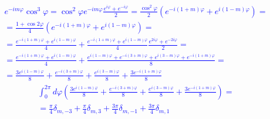 \textcolor{blue}{ \begin{equation*} \begin{aligned}
e^{-i m \varphi} \cos^3 \varphi = 
\cos^2 \varphi e^{-i m \varphi} \frac{e^{i \varphi} + e^{-i \varphi}}{2} =
\frac{\cos^2 \varphi}{2} 
\left( e^{-i (1+m) \varphi} + e^{i (1-m) \varphi} \right) = \\
= \frac{ 1 + \cos 2 \varphi } { 4 } 
\left( e^{-i (1+m) \varphi} + e^{i (1-m) \varphi} \right) = \\
= \frac{e^{-i(1+m) \varphi} + e^{i(1-m) \varphi}}{4} + 
\frac{e^{-i(1+m) \varphi} + e^{i(1-m) \varphi}}{4}
\frac{e^{2i\varphi} + e^{-2i\varphi}}{2} = \\
= \frac{e^{-i(1+m) \varphi} + e^{i(1-m) \varphi}}{4} +
\frac{ e^{i(1-m) \varphi} + e^{-i(3+m) \varphi} + 
e^{i(3-m) \varphi} + e^{-i(1+m) \varphi} }{8} = \\
= \frac{3 e^{i(1-m) \varphi}}{8} + \frac{e^{-i(3+m) \varphi}}{8} +
\frac{e^{i(3-m) \varphi}}{8} + \frac{ 3 e^{-i(1+m) \varphi} }{8}
\end{aligned} \end{equation*} }
%
\textcolor{blue}{ \begin{equation*} \begin{aligned}
\int_{0}^{2\pi} d \varphi \left( \frac{3 e^{i(1-m) \varphi}}{8} + 
\frac{e^{-i(3+m) \varphi}}{8} + \frac{e^{i(3-m) \varphi}}{8} + 
\frac{ 3 e^{-i(1+m) \varphi} }{8} \right) = \\
= \frac{\pi}{4} \delta_{m,-3} + \frac{\pi}{4} \delta_{m,3} + 
\frac{3 \pi}{4} \delta_{m,-1} + \frac{3 \pi}{4} \delta_{m,1}
\end{aligned} \end{equation*} }
